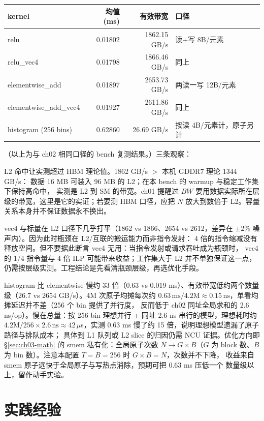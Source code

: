 \begin{center}
\begin{tabular}{lrrl}
\toprule
kernel & 均值 (ms) & 有效带宽 & 口径 \\
\midrule
relu & 0.01802 & 1862.15 GB/s & 读+写 8B/元素 \\
relu\_vec4 & 0.01798 & 1866.46 GB/s & 同上 \\
elementwise\_add & 0.01897 & 2653.73 GB/s & 两读一写 12B/元素 \\
elementwise\_add\_vec4 & 0.01927 & 2611.86 GB/s & 同上 \\
histogram (256 bins) & 0.62860 & 26.69 GB/s & 按读 4B/元素计，原子另计 \\
\bottomrule
\end{tabular}
\end{center}

（以上为与 ch02 相同口径的 bench 复测结果。）三条观察：

L2 命中让实测超过 HBM 理论值。1862 GB/s $>$ 本机 GDDR7 理论 1344 GB/s：
数据 16 MB 可装入 96 MB 的 L2；在本 bench 的 warmup 与稳定工作集下保持高命中，
实测是 L2 到 SM 的带宽。ch01 提醒过 $BW$
要用数据实际所在层级的带宽，这里是它的实证；若要测 HBM 口径，应把 $N$
放大到数倍于 L2。容量关系本身并不保证数据永不换出。

vec4 与标量在 L2 口径下几乎打平（1862 vs 1866、2654 vs 2612，差异在
$\pm 2\%$ 噪声内）。因为此时瓶颈在 L2/互联的搬运能力而非指令发射：
4 倍的指令缩减没有释放空间。但不要据此断言 vec4 无用：当指令发射或请求吞吐成为瓶颈时，
vec4 的 1/4 指令量与 4 倍 ILP 可能带来收益；工作集大于 L2 并不单独保证这一点，
仍需按层级实测。工程结论是先看清瓶颈层级，再选优化手段。

histogram 比 elementwise 慢约 33 倍（0.63 vs 0.019 ms）、有效带宽低约两个数量级（26.7 vs 2654 GB/s）。4M 次原子均摊每次约 $0.63\,\mathrm{ms}/4.2\mathrm{M}
\approx 0.15\,\mathrm{ns}$，单看均摊延迟并不差（256 个 bin 提供了并行度，
反而低于 ch02 同址全局求和的 2.6 ns/op）。慢在总量：按 256 bin 理想并行
+ 同址 2.6 ns 串行的模型，理想耗时约 $4.2\mathrm{M}/256 \times 2.6\,\mathrm{ns}
\approx 42\,\mu$s，实测 0.63 ms 慢了约 15 倍，说明理想模型遗漏了原子路径与排队成本；
具体到 L1 队列或 L2 slice 的归因仍需 NCU 证据。优化方向即 \S\ref{sec:ch03-math} 的 smem
私有化：全局原子次数 $N \to G \times B$（$G$ 为 block 数、$B$ 为
bin 数）。注意本配置 $T{=}B{=}256$ 时 $G \times B = N$，次数并不下降，
收益来自 smem 原子远快于全局原子与写热点消除，预期可把 0.63 ms 压低一个
数量级以上，留作动手实验。

\section{实践经验}\label{sec:ch03-kaogu}

